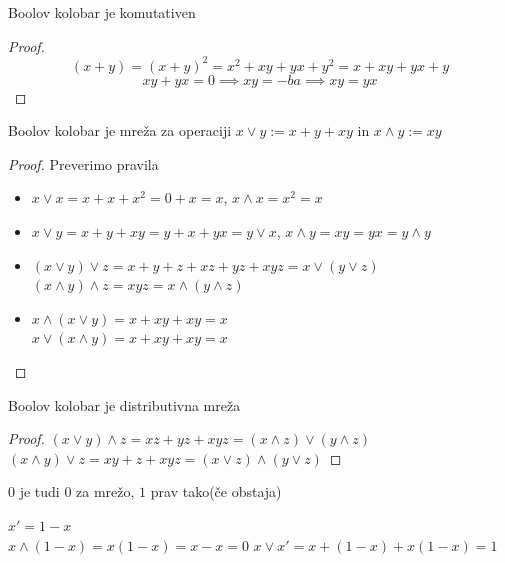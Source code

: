 \documentclass[slovene]{beamer}
\begin{document}
\begin{frame}


\begin{theorem}
Boolov kolobar je komutativen
\end{theorem}
\pause
\begin{proof}
$$(x + y) = (x+y)^2 = x^2 + xy + yx + y^2 = x + xy + yx + y$$ 
$$xy + yx = 0 \implies xy = -ba \implies xy = yx $$
\end{proof}
\end{frame}

\begin{frame}
\begin{theorem}
Boolov kolobar je mreža za operaciji $x \lor y := x + y + xy$ in $x \land y := xy$
\end{theorem}
\end{frame}

\begin{frame}
\begin{proof}
Preverimo pravila
\begin{itemize}
\item $x \lor x = x + x + x^2 = 0 + x = x$, $x \land x = x^2 = x$
\item $x \lor y = x + y + xy = y + x + yx = y \lor x$, $x \land y = xy = yx = y \land y$\pause
\item $(x \lor y) \lor z  = x + y + z + xz + yz +xyz = x \lor (y \lor z)$\pause
$(x \land y) \land z = xyz = x \land (y \land z)$ 
\item $x \land (x \lor y) = x + xy + xy = x$\\ \pause
$x \lor (x \land y) = x + xy + xy = x$
\end{itemize}
\end{proof}
\end{frame}

\begin{frame}
\begin{theorem}
Boolov kolobar je distributivna mreža
\end{theorem}
\begin{proof}
$(x \lor y) \land z = xz + yz + xyz = (x \land z) \lor (y \land z)$ \\
$(x \land y) \lor z = xy + z + xyz = (x \lor z) \land (y \lor z)$
\end{proof}
\end{frame}

\begin{frame}
\begin{block}{}
$0$ je tudi $0$ za mrežo, $1$ prav tako(če obstaja)
\end{block}

\begin{block}{}
$x' = 1-x $ \\ \pause
$x \land (1-x) = x(1-x) = x - x = 0 $
$x \lor x'= x + (1-x) + x(1-x) = 1 $
\end{block}


\end{frame}
\end{document}
